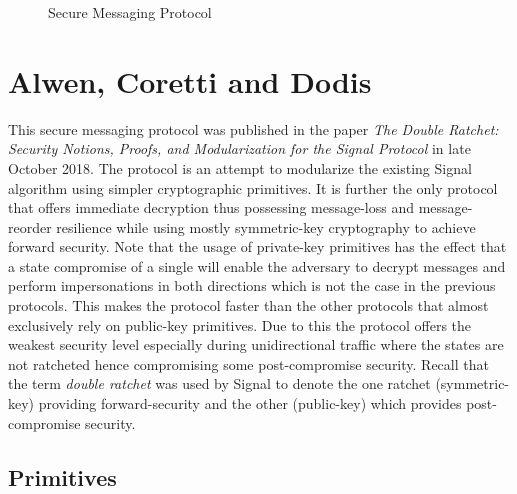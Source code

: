 \documentclass[11pt,a4paper,twoside,openright,bibliography=totoc]{scrbook}
\begin{document}
\begin{figure}[p]
  \centering
  \setlength{\fboxsep}{10pt}
  \scalebox{0.9}{%
    \fbox{%
      
    } 
  }
  \caption{Secure Messaging Protocol}
  \label{fig:secmsg}
\end{figure}

\clearpage

\section[Alwen, Coretti and Dodis]
{Alwen, Coretti and Dodis~\cite{alwen2018double}}
\label{sec:alwen-coretti-dodis}

This secure messaging protocol was published in the paper \textit{The
Double Ratchet: Security Notions, Proofs, and Modularization for the
Signal Protocol} in late October 2018. The protocol is an attempt to
modularize the existing Signal algorithm using simpler cryptographic
primitives. It is further the only protocol that offers immediate
decryption thus possessing message-loss and message-reorder resilience
while using mostly symmetric-key cryptography to achieve forward security.
Note that the usage of private-key primitives has the effect that
a state compromise of a single will enable the adversary to
decrypt messages and perform impersonations in both directions which
is not the case in the previous protocols.
This makes the protocol faster than the
other protocols that almost exclusively rely on public-key primitives.
Due to this the protocol offers the weakest security level especially
during unidirectional traffic where the states are not ratcheted hence
compromising some post-compromise security. Recall that the term
\textit{double ratchet} was used by Signal to denote the one ratchet
(symmetric-key)
providing forward-security and the other (public-key) which provides post-compromise
security.

\subsection{Primitives}
\label{sec:primitives-4}
\end{document}
